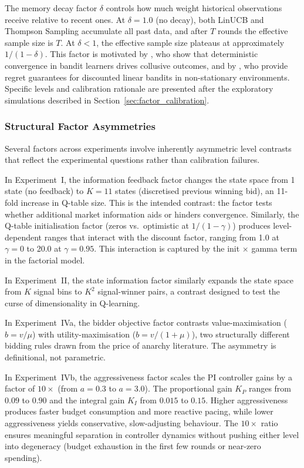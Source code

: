 The memory decay factor $\delta$ controls how much weight historical observations receive relative to recent ones. At $\delta = 1.0$ (no decay), both LinUCB and Thompson Sampling accumulate all past data, and after $T$ rounds the effective sample size is $T$. At $\delta < 1$, the effective sample size plateaus at approximately $1/(1-\delta)$. This factor is motivated by \citet{Douglas2024}, who show that deterministic convergence in bandit learners drives collusive outcomes, and by \citet{Russac2019}, who provide regret guarantees for discounted linear bandits in non-stationary environments. Specific levels and calibration rationale are presented after the exploratory simulations described in Section~\ref{sec:factor_calibration}.

\subsubsection{Structural Factor Asymmetries}

Several factors across experiments involve inherently asymmetric level contrasts that reflect the experimental questions rather than calibration failures.

In Experiment~I, the information feedback factor changes the state space from 1 state (no feedback) to $K = 11$ states (discretised previous winning bid), an 11-fold increase in Q-table size. This is the intended contrast: the factor tests whether additional market information aids or hinders convergence. Similarly, the Q-table initialisation factor (zeros vs.\ optimistic at $1/(1-\gamma)$) produces level-dependent ranges that interact with the discount factor, ranging from 1.0 at $\gamma = 0$ to 20.0 at $\gamma = 0.95$. This interaction is captured by the init $\times$ gamma term in the factorial model.

In Experiment~II, the state information factor similarly expands the state space from $K$ signal bins to $K^2$ signal-winner pairs, a contrast designed to test the curse of dimensionality in Q-learning.

In Experiment~IVa, the bidder objective factor contrasts value-maximisation ($b = v/\mu$) with utility-maximisation ($b = v/(1+\mu)$), two structurally different bidding rules drawn from the price of anarchy literature. The asymmetry is definitional, not parametric.

In Experiment~IVb, the aggressiveness factor scales the PI controller gains by a factor of $10\times$ (from $a = 0.3$ to $a = 3.0$). The proportional gain $K_P$ ranges from $0.09$ to $0.90$ and the integral gain $K_I$ from $0.015$ to $0.15$. Higher aggressiveness produces faster budget consumption and more reactive pacing, while lower aggressiveness yields conservative, slow-adjusting behaviour. The $10\times$ ratio ensures meaningful separation in controller dynamics without pushing either level into degeneracy (budget exhaustion in the first few rounds or near-zero spending).


